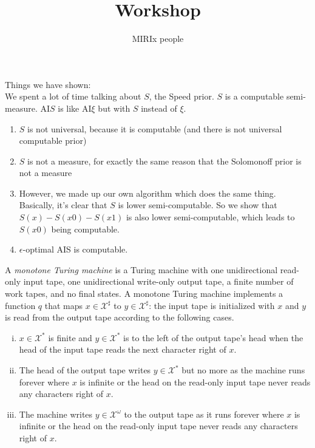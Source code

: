 \documentclass[11pt]{amsart}
\title{Workshop}
\author{MIRIx people}
\def\X{\mathcal{X}}
\begin{document}
\maketitle

Things we have shown:\\

We spent a lot of time talking about $S$, the Speed prior. $S$ is a computable semi-measure. AI$S$ is like AI$\xi$ but with $S$ instead of $\xi$.\\

\begin{enumerate}
\item $S$ is not universal, because it is computable (and there is not universal computable prior)
\item $S$ is not a measure, for exactly the same reason that the Solomonoff prior is not a measure
\item However, we made up our own algorithm which does the same thing. Basically, it's clear that $S$ is lower semi-computable. So we show that $S(x)- S(x0) - S(x1)$ is also lower semi-computable, which leads to $S(x0)$ being computable.
\item $\epsilon$-optimal AIS is computable.
\end{enumerate}



\begin{definition}
\label{def:monotone-TM}
A \emph{monotone Turing machine}
is a Turing machine with
one unidirectional read-only input tape,
one unidirectional write-only output tape,
a finite number of work tapes, and no final states.
A monotone Turing machine implements a function $q$
that maps $x \in \X^\sharp$ to $y \in \X^\sharp$:
the input tape is initialized with $x$
and $y$ is read from the output tape according to the following cases.
\begin{enumerate}[(i)]
\item $x \in \X^*$ is finite and
	$y \in \X^*$ is to the left of the output tape's head when
	the head of the input tape reads the next character right of $x$.
\item The head of the output tape writes $y \in \X^*$ but no more
	as the machine runs forever where
	$x$ is infinite or
	the head on the read-only input tape never reads any characters right of $x$.
\item The machine writes $y \in \X^\omega$ to the output tape
	as it runs forever where
	$x$ is infinite or
	the head on the read-only input tape never reads any characters right of $x$.
\end{enumerate}
\end{definition}




\end{document}
